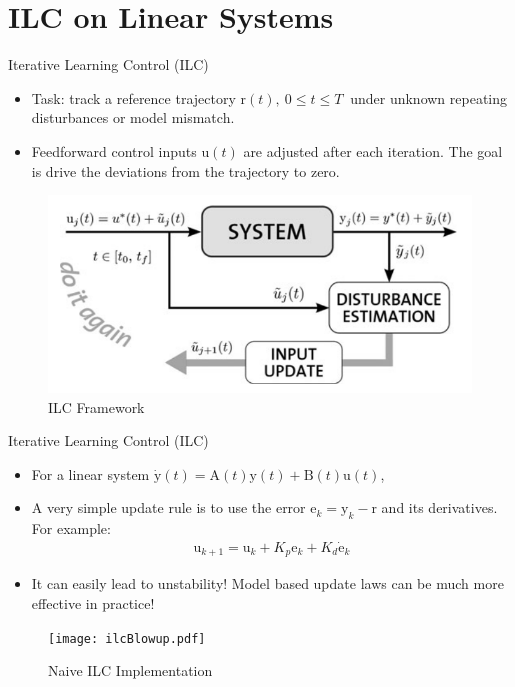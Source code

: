 \documentclass[handout]{beamer}
\newcommand{\boldvec}[1]{\boldsymbol{\mathrm{#1}}}
\let\vec\boldvec
\newcommand{\state}{\vec{y}} %
\newcommand{\error}{\vec{e}} %
\newcommand{\traj}{\vec{r}} %
\newcommand{\sysInput}{\vec{u}} %
\begin{document}
\section{ILC on Linear Systems}
%
\begin{frame}{Iterative Learning Control (ILC)}
\begin{itemize}
\item Task: track a reference trajectory $\traj(t), \ 0 \leq t \leq T \ $ under unknown repeating disturbances or model mismatch.
\item Feedforward control inputs $\sysInput(t)$ are adjusted after each iteration. The goal is drive the deviations from the trajectory to zero. 
\end{itemize}
\begin{figure}
\center
\includegraphics[scale=0.25]{ilc_framework}			
\caption{ILC Framework}
\end{figure}
\end{frame}
%
\begin{frame}{Iterative Learning Control (ILC)}
\begin{itemize}
\item For a linear system $\dot{\state}(t) = \boldvec{A}(t)\state(t) + \boldvec{B}(t)\sysInput(t)$,
\item A very simple update rule is to use the error $\error_k = \state_k - \traj$ and its derivatives. For example:
\begin{equation*}
\begin{aligned}
\sysInput_{k+1} = \sysInput_{k} + K_{p}\error_k + K_{d}\dot{\error}_k
\end{aligned}
\end{equation*}
\item It can easily lead to unstability! Model based update laws can be much more effective in practice!
\end{itemize}
\begin{figure}
\center
\texttt{[image: ilcBlowup.pdf]}			
\caption{Naive ILC Implementation}
\end{figure}
\end{frame}
\end{document}
